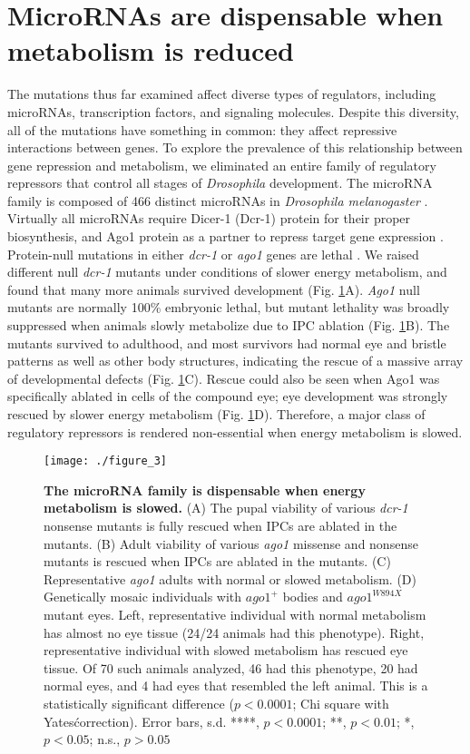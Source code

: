 \section{MicroRNAs are dispensable when metabolism is reduced}

The mutations thus far examined affect diverse types of regulators, including microRNAs, transcription factors, and signaling molecules. Despite this diversity, all of the mutations have something in common: they affect repressive interactions between genes. To explore the prevalence of this relationship between gene repression and metabolism, we eliminated an entire family of regulatory repressors that control all stages of \textit{Drosophila} development. The microRNA family is composed of 466 distinct microRNAs in \textit{Drosophila melanogaster} \cite{Kozomara2014}. Virtually all microRNAs require Dicer-1 (Dcr-1) protein for their proper biosynthesis, and Ago1 protein as a partner to repress target gene expression \cite{Carthew2009a}. Protein-null mutations in either \textit{dcr-1} or \textit{ago1} genes are lethal \cite{Pressman2012}. We raised different null \textit{dcr-1} mutants under conditions of slower energy metabolism, and found that many more animals survived development (Fig. \ref{fig:metabolism:fig3}A). \textit{Ago1} null mutants are normally 100\% embryonic lethal, but mutant lethality was broadly suppressed when animals slowly metabolize due to IPC ablation (Fig. \ref{fig:metabolism:fig3}B). The mutants survived to adulthood, and most survivors had normal eye and bristle patterns as well as other body structures, indicating the rescue of a massive array of developmental defects (Fig. \ref{fig:metabolism:fig3}C). Rescue could also be seen when Ago1 was specifically ablated in cells of the compound eye; eye development was strongly rescued by slower energy metabolism (Fig. \ref{fig:metabolism:fig3}D). Therefore, a major class of regulatory repressors is rendered non-essential when energy metabolism is slowed.

\begin{figure}[h!]
\centering
\texttt{[image: ./figure\_3]}
\caption[The microRNA family is dispensable when energy metabolism is slowed.]{\textbf{The microRNA family is dispensable when energy metabolism is slowed.} (A) The pupal viability of various \textit{dcr-1} nonsense mutants is fully rescued when IPCs are ablated in the mutants. (B) Adult viability of various \textit{ago1} missense and nonsense mutants is rescued when IPCs are ablated in the mutants. (C) Representative \textit{ago1} adults with normal or slowed metabolism. (D) Genetically mosaic individuals with $ago1^+$ bodies and $ago1^{W894X}$ mutant eyes. Left, representative individual with normal metabolism has almost no eye tissue (24/24 animals had this phenotype). Right, representative individual with slowed metabolism has rescued eye tissue. Of 70 such animals analyzed, 46 had this phenotype, 20 had normal eyes, and 4 had eyes that resembled the left animal. This is a statistically significant difference ($p<0.0001$; Chi square with Yates\' correction). Error bars, s.d. ****, $p<0.0001$; **, $p<0.01$; *, $p<0.05$; n.s., $p>0.05$}
\label{fig:metabolism:fig3}
\end{figure}

